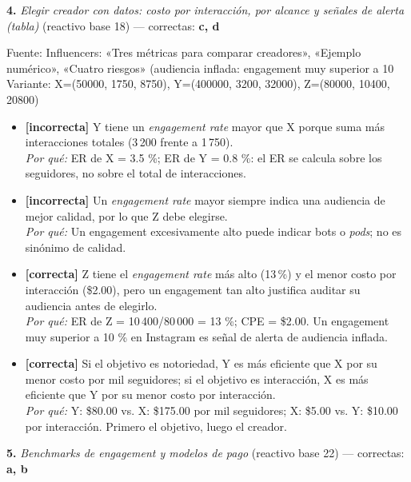 \documentclass[10pt,letterpaper]{article}
\begin{document}
\vspace{3pt}\noindent\textbf{4.} \textit{Elegir creador con datos: costo por interacción, por alcance y señales de alerta (tabla)} (reactivo base 18) — correctas: \textbf{c, d}\\[-1pt]
{\scriptsize Fuente: Influencers: «Tres métricas para comparar creadores», «Ejemplo numérico», «Cuatro riesgos» (audiencia inflada: engagement muy superior a 10 %
\\{\scriptsize Variante: X=(50000, 1750, 8750), Y=(400000, 3200, 32000), Z=(80000, 10400, 20800)}
\begin{itemize}[leftmargin=1.2em,itemsep=0pt,topsep=1pt,parsep=0pt]
\item[\textbf{a)}] {\footnotesize \textbf{[incorrecta]} Y tiene un \textit{engagement rate} mayor que X porque suma más interacciones totales (3\,200 frente a 1\,750).\\ \textit{Por qué:} ER de X = 3.5 \%; ER de Y = 0.8 \%: el ER se calcula sobre los seguidores, no sobre el total de interacciones.}
\item[\textbf{b)}] {\footnotesize \textbf{[incorrecta]} Un \textit{engagement rate} mayor siempre indica una audiencia de mejor calidad, por lo que Z debe elegirse.\\ \textit{Por qué:} Un engagement excesivamente alto puede indicar bots o \textit{pods}; no es sinónimo de calidad.}
\item[\textbf{c)}] {\footnotesize \textbf{[correcta]} Z tiene el \textit{engagement rate} más alto (13\,\%) y el menor costo por interacción (\$2.00), pero un engagement tan alto justifica auditar su audiencia antes de elegirlo.\\ \textit{Por qué:} ER de Z = 10\,400/80\,000 = 13 \%; CPE = \$2.00. Un engagement muy superior a 10 \% en Instagram es señal de alerta de audiencia inflada.}
\item[\textbf{d)}] {\footnotesize \textbf{[correcta]} Si el objetivo es notoriedad, Y es más eficiente que X por su menor costo por mil seguidores; si el objetivo es interacción, X es más eficiente que Y por su menor costo por interacción.\\ \textit{Por qué:} Y: \$80.00 vs. X: \$175.00 por mil seguidores; X: \$5.00 vs. Y: \$10.00 por interacción. Primero el objetivo, luego el creador.}
\end{itemize}
\vspace{3pt}\noindent\textbf{5.} \textit{Benchmarks de engagement y modelos de pago} (reactivo base 22) — correctas: \textbf{a, b}\\[-1pt]
}
\end{document}
